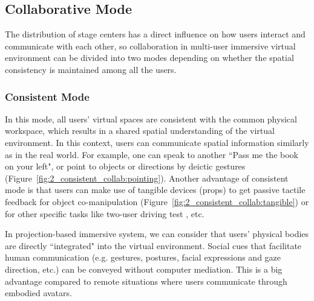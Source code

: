 \subsection{Collaborative Mode}
The distribution of stage centers has a direct influence on how users interact and communicate with each other, so collaboration in multi-user immersive virtual environment can be divided into two modes depending on whether the spatial consistency is maintained among all the users.


\subsubsection{Consistent Mode}
In this mode, all users' virtual spaces are consistent with the common physical workspace, which results in a shared spatial understanding of the virtual environment. In this context, users can communicate spatial information similarly as in the real world. For example, one can speak to another ``Pass me the book on your left", or point to objects or directions by deictic gestures \citep{Salzmann2009VRPointing} (Figure~\ref{fig:2_consistent_collab:pointing}). Another advantage of consistent mode is that users can make use of tangible devices (props) to get passive tactile feedback for object co-manipulation \citep{Aguerreche2009Three, Salzmann2009CIC} (Figure~\ref{fig:2_consistent_collab:tangible}) or for other specific tasks like two-user driving test \citep{Salzmann2008TUS}, etc.

In projection-based immersive system, we can consider that users' physical bodies are directly ``integrated" into the virtual environment. Social cues that facilitate human communication (e.g. gestures, postures, facial expressions and gaze direction, etc.) can be conveyed without computer mediation. This is a big advantage compared to remote situations where users communicate through embodied avatars. 

